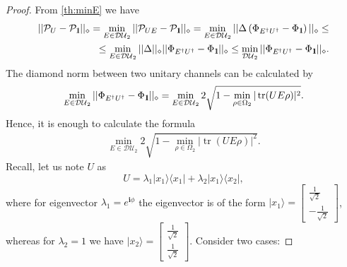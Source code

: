 \documentclass[11pt,a4paper,reqno, oneside]{amsart}
\DeclareMathOperator{\tr}{tr}
\newcommand{\ket}[1]{\ensuremath{|#1\rangle}}
\newcommand{\bra}[1]{\ensuremath{\langle#1|}}
\newcommand{\ketbra}[2]{\ensuremath{\ket{#1} \! \bra{#2}}}
\newcommand{\1}{{\rm 1\hspace{-0.9mm}l}}
\newcommand{\diaguni}{\ensuremath{\mathcal{DU}}}
\begin{document}
\begin{proof} From \ref{th:minE} we have 
	\begin{equation}
	\begin{split}
	||\mathcal{P}_U - \mathcal{P}_{\1}||_\diamond =\min_{E \in \diaguni_2} ||\mathcal{P}_{UE} - \mathcal{P}_{\1}||_\diamond = \min_{E \in \diaguni_2}|| \Delta \left(\Phi_{E^\dagger U^\dagger} - \Phi_{\1} \right) ||_\diamond \le \\ \le \min_{E \in \diaguni_2} ||\Delta||_\diamond || \Phi_{E^\dagger U^\dagger} - \Phi_{\1}  ||_\diamond \le \min_{\diaguni_2}|| \Phi_{E^\dagger U^\dagger} - \Phi_{\1} ||_\diamond.
	\end{split}
	\end{equation}
The diamond norm between two unitary channels can be calculated by 
	\begin{equation}
	\min_{E \in \diaguni_2}||\Phi_{E^\dagger U^\dagger} - \Phi_\1||_\diamond  = \min_{E \in \diaguni_2} 2\sqrt{1 - \min_{\rho \in \Omega_2} |\tr(UE \rho )|^2}.
	\end{equation}
Hence,  it is enough to calculate the formula
\begin{equation}
\begin{split}
\min_{E \in \diaguni_2} 2\sqrt{1 - \min_{\rho \in \Omega_2} |\tr(UE \rho )|^2}.
\end{split}
\end{equation}
Recall, let us note $U$ as
\begin{equation}
U= \lambda_1 \ketbra{x_1}{x_1} + \lambda_2 \ketbra{x_1}{x_2}, 
\end{equation}
where  for eigenvector $\lambda_1 = e^{\mathbf{i} \phi}$ the eigenvector is of the form $\ket{x_1} = \left[\begin{array}{c}\frac{1}{\sqrt{2}}\\-\frac{1}{\sqrt{2}}\end{array}\right]$, whereas for  $\lambda_2 = 1$ we have $\ket{x_2} = \left[\begin{array}{c}\frac{1}{\sqrt{2}}\\\frac{1}{\sqrt{2}}\end{array}\right]$. 
Consider two cases:


\end{proof}
\end{document}
